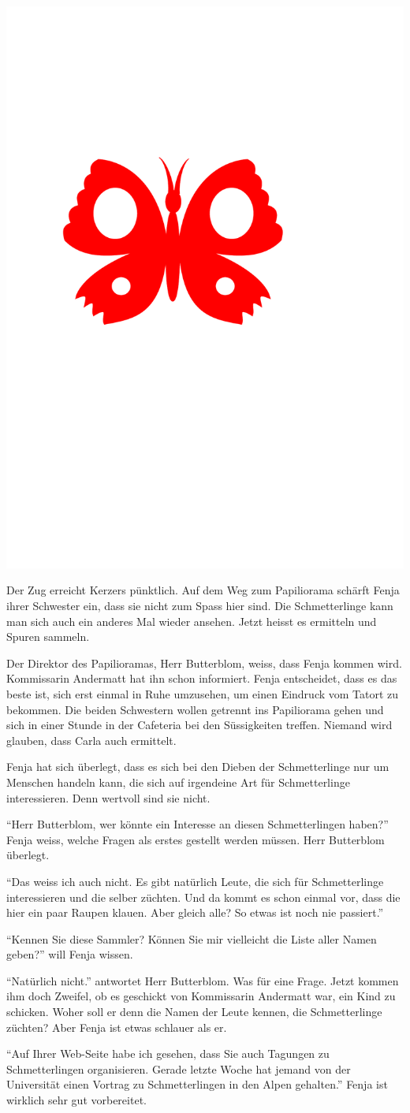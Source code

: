 \begin{center}
\includegraphics[width=.05\textwidth]{bilder/inkling.pdf}
\end{center}
Der Zug erreicht Kerzers pünktlich. Auf dem Weg zum Papiliorama schärft Fenja ihrer Schwester ein, dass sie nicht zum Spass hier sind. Die Schmetterlinge kann man sich auch ein anderes Mal wieder ansehen. Jetzt heisst es ermitteln und Spuren sammeln.

Der Direktor des Papilioramas, Herr Butterblom, weiss, dass Fenja kommen wird. Kommissarin Andermatt hat ihn schon informiert. Fenja entscheidet, dass es das beste ist, sich erst einmal in Ruhe umzusehen, um einen Eindruck vom Tatort zu bekommen. Die beiden Schwestern wollen getrennt ins Papiliorama gehen und sich in einer Stunde in der Cafeteria bei den Süssigkeiten treffen. Niemand wird glauben, dass Carla auch ermittelt.

Fenja hat sich überlegt, dass es sich bei den Dieben der Schmetterlinge nur um Menschen handeln kann, die sich auf irgendeine Art für Schmetterlinge interessieren. Denn wertvoll sind sie nicht.  

\enquote{Herr Butterblom, wer könnte ein Interesse an diesen Schmetterlingen haben?} Fenja weiss, welche Fragen als erstes gestellt werden müssen. Herr Butterblom überlegt.

\enquote{Das weiss ich auch nicht. Es gibt natürlich Leute, die sich für Schmetterlinge interessieren und die selber züchten. Und da kommt es schon einmal vor, dass die hier ein paar Raupen klauen. Aber gleich alle? So etwas ist noch nie passiert.} 

\enquote{Kennen Sie diese Sammler? Können Sie mir vielleicht die Liste aller Namen geben?} will Fenja wissen.

\enquote{Natürlich nicht.} antwortet Herr Butterblom. Was für eine Frage. Jetzt kommen ihm doch Zweifel, ob es geschickt von Kommissarin Andermatt war, ein Kind zu schicken. Woher soll er denn die Namen der Leute kennen, die Schmetterlinge züchten? Aber Fenja ist etwas schlauer als er.

\enquote{Auf Ihrer Web-Seite habe ich gesehen, dass Sie auch Tagungen zu Schmetterlingen organisieren. Gerade letzte Woche hat jemand von der Universität einen Vortrag zu Schmetterlingen in den Alpen gehalten.} Fenja ist wirklich sehr gut vorbereitet. 

